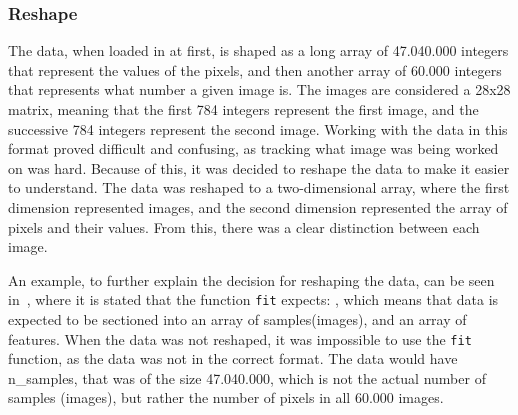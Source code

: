 \subsubsection{Reshape}\label{subsec:preprocessing-reshape}
The data, when loaded in at first, is shaped as a long array of 47.040.000 integers that represent the values of the pixels, and then another array of 60.000 integers that represents what number a given image is. The images are considered a 28x28 matrix, meaning that the first 784 integers represent the first image, and the successive 784 integers represent the second image. Working with the data in this format proved difficult and confusing, as tracking what image was being worked on was hard. Because of this, it was decided to reshape the data to make it easier to understand. The data was reshaped to a two-dimensional array, where the first dimension represented images, and the second dimension represented the array of pixels and their values. From this, there was a clear distinction between each image.

  
An example, to further explain the decision for reshaping the data, can be seen in~\cite{scikit-learn-PCA}, where it is stated that the function \texttt{fit} expects: , which means that data is expected to be sectioned into an array of samples(images), and an array of features. When the data was not reshaped, it was impossible to use the \texttt{fit} function, as the data was not in the correct format. The data would have n\_samples, that was of the size 47.040.000, which is not the actual number of samples (images), but rather the number of pixels in all 60.000 images.